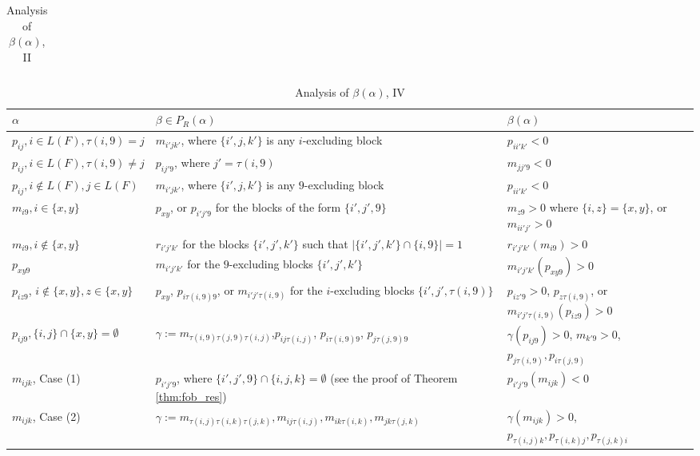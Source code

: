\documentclass[10pt,a4paper]{amsart}
\numberwithin{equation}{section}
\newcommand{\al}{\alpha}
\newcommand{\be}{\beta}
\newcommand{\pra}{P_R(\al)}
\newcommand{\abs}[1]{\lvert #1 \rvert}
\begin{document}
\begin{landscape}
\begin{table}[b]
\begin{tabular}{@{}lll@{}}
\end{tabular}
\caption{Analysis of $\be(\al)$, II}
\label{tab:mob2}
\end{table}
%
\begin{table}[b]
  \centering
\begin{tabular}{@{}lll@{}}
\toprule
  $\al$ & $\be\in \pra$ & $\be(\al)$ \\
  \midrule
  $p_{ij}, i\in L(F), \tau(i,9)=j$ & $m_{i'jk'}$, where $\{i',j,k'\}$ is any
 $i$-excluding block & $p_{ii'k'}<0$ \\
  $p_{ij}, i\in L(F),\tau(i,9)\neq j$ & $p_{ij'9}$, where $j'=\tau(i,9)$ & $m_{jj'9}<0$\\
  $p_{ij}, i\notin L(F), j\in L(F)$ & $m_{i'jk'}$, where $\{i',j,k'\}$ is any
 $9$-excluding block& $p_{ii'k'}<0$\\
  \midrule
  $m_{i9}, i\in \{x,y\}$ & $p_{xy}$, or $p_{i'j'9}$ for the blocks of the form
  $\{i',j',9\}$ & $m_{z9}>0$ where $\{i,z\}=\{x,y\}$, or $m_{ii'j'}>0$\\
  $m_{i9}, i\notin\{x,y\}$ & $r_{i'j'k'}$ for the blocks $\{i',j',k'\}$ such that $\abs{\{i',j',k'\}\cap \{i,9\}}=1$& $r_{i'j'k'}(m_{i9})>0$ \\
  \midrule
  $p_{xy9}$ & $m_{i'j'k'}$ for the $9$-excluding blocks $\{i',j',k'\}$  & $m_{i'j'k'}(p_{xy9})>0$\\
  $p_{iz9}$, $i\notin \{x,y\},z\in \{x,y\}$ & $p_{xy}$, $p_{i\tau(i,9)9}$, or
  $m_{i'j'\tau(i,9)}$ for the $i$-excluding blocks $\{i',j',\tau(i,9)\}$& $p_{iz'9}>0$,
$p_{z\tau(i,9)}$, or $m_{i'j'\tau(i,9)}(p_{iz9})>0$\\ 
  $p_{ij9}, \{i,j\}\cap \{x,y\}=\emptyset$ &
  $\gamma:=m_{\tau(i,9)\tau(j,9)\tau(i,j)}$,$p_{ij\tau(i,j)}$,
  $p_{i\tau(i,9)9}$, $p_{j\tau(j,9)9}$ & $\gamma(p_{ij9})>0$, $m_{k'9}>0$,
  $p_{j\tau(i,9)}, p_{i\tau(j,9)}$\\
  \midrule
  $m_{ijk}$, Case (1) & $p_{i'j'9}$, where $\{i',j',9\}\cap\{i,j,k\}=\emptyset$
  (see the proof of Theorem \ref{thm:fob_res}) & $p_{i'j'9}(m_{ijk})<0$\\
  $m_{ijk}$, Case (2) & $\gamma:=m_{\tau(i,j)\tau(i,k)\tau(j,k)}, m_{ij\tau(i,j)},m_{ik\tau(i,k)}, m_{jk\tau(j,k)}
  $ & $\gamma(m_{ijk})>0$, $p_{\tau(i,j)k},p_{\tau(i,k)j}, p_{\tau(j,k)i}$\\
  \bottomrule
\end{tabular}
\caption{Analysis of $\be(\al)$, IV}
\label{tab:fob2}
\end{table}
\end{landscape}
\end{document}
